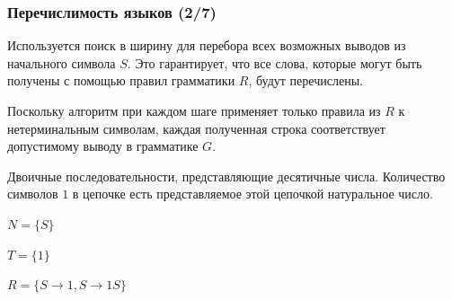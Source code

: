 \begin{frame}
    \frametitle{Перечислимость языков (2/7)}

    \begin{ground}
        Используется поиск в ширину для перебора всех возможных выводов из начального символа $S$. Это гарантирует, что все слова, которые могут быть получены с помощью правил грамматики $R$, будут перечислены.

        Поскольку алгоритм при каждом шаге применяет только правила из $R$ к нетерминальным символам, каждая полученная строка соответствует допустимому выводу в грамматике $G$.
    \end{ground}
    \begin{example}

        Двоичные последовательности, представляющие десятичные числа. Количество символов $1$ в цепочке есть представляемое этой цепочкой натуральное число.

        $N = \{S\}$

        $T = \{1\}$

        $R = \{S \rightarrow 1, S \rightarrow 1S\}$
    \end{example}

\end{frame}

